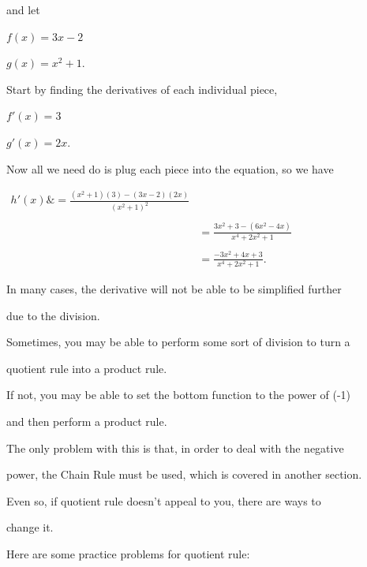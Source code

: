 {{{{and let



$f(x) = 3x - 2$



$g(x) = x^2 + 1.$



Start by finding the derivatives of each individual piece,



$f'(x) = 3$



$g'(x) = 2x.$



Now all we need do is plug each piece into the equation, so we have



$\begin{aligned}

h'(x) \&= \frac {(x^2 + 1)(3) - (3x - 2)(2x)}{(x^2 + 1)^2} \\\\&= \frac {3x^2 + 3 - (6x^2 - 4x)}{x^4 + 2x^2 + 1} \\\\&= \frac {-3x^2 + 4x + 3}{x^4 + 2x^2 + 1}.

\end{aligned}$



In many cases, the derivative will not be able to be simplified further

due to the division.



Sometimes, you may be able to perform some sort of division to turn a

quotient rule into a product rule.



If not, you may be able to set the bottom function to the power of (-1)

and then perform a product rule.



The only problem with this is that, in order to deal with the negative

power, the Chain Rule must be used, which is covered in another section.



Even so, if quotient rule doesn't appeal to you, there are ways to

change it.



Here are some practice problems for quotient rule:



}}}}
